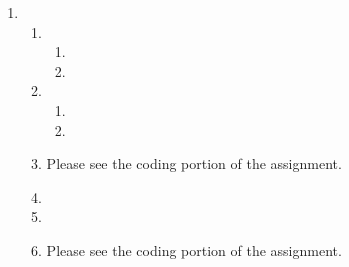 \documentclass[10pt,reqno]{amsart}
\begin{document}
\begin{enumerate}[topsep=0pt,itemsep=3ex,partopsep=1ex,parsep=1ex]
\item
  \begin{enumerate}[itemsep=2ex]
  \item 
    \begin{enumerate}[itemsep=2ex]
      \item
      \item 
    \end{enumerate}
  \item
    \begin{enumerate}[itemsep=2ex]
      \item
      \item 
    \end{enumerate}
  \item Please see the coding portion of the assignment.
  \item %
  \item 
  \item Please see the coding portion of the assignment.
  \end{enumerate}


\end{enumerate}
\end{document}

